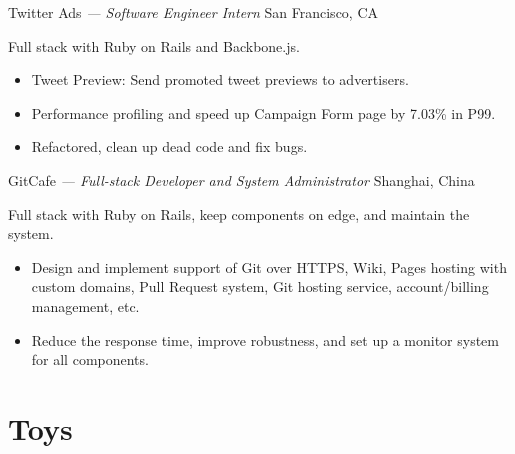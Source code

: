 \documentclass[]{friggeri-cv} %
\begin{document}
  \begin{entrylist}
  {Twitter Ads \emph{--- Software Engineer Intern}}
  {San Francisco, CA}
  {
    Full stack with Ruby on Rails and Backbone.js.\@
    \begin{itemize}
      \item Tweet Preview: Send promoted tweet previews to advertisers.
      \item Performance profiling and speed up Campaign Form page by 7.03\% in P99.
      \item Refactored, clean up dead code and fix bugs.
    \end{itemize}
  }
  {GitCafe \emph{--- Full-stack Developer and System Administrator}}
  {Shanghai, China}
  {
    Full stack with Ruby on Rails, keep components on edge, and maintain the system.
    \begin{itemize}
    \item Design and implement support of Git over HTTPS, Wiki, Pages hosting with custom domains,
    Pull Request system, Git hosting service, account/billing management, etc.
    \item Reduce the response time, improve robustness, and set up a monitor system for all components.
    \end{itemize}
  }
\end{entrylist}


\section{Toys}
\end{document}
